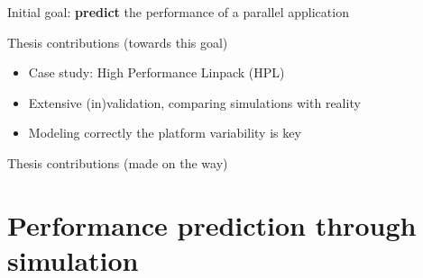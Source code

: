 \documentclass[10pt]{beamer}
\begin{document}
\begin{frame}[plain]
    \onslide<+->
    \begin{LARGE}
        Initial goal: \alert{\textbf{predict}} the performance of a parallel application
    \end{LARGE}
    \vfill
    \onslide<+->
    \begin{block}{Thesis contributions (towards this goal)}
        \begin{itemize}
            \item Case study: High Performance Linpack (HPL)
            \item Extensive (in)validation, comparing simulations with reality
            \item Modeling correctly the platform variability is key
        \end{itemize}
    \end{block}
    \onslide<+->
    \begin{block}{Thesis contributions (made on the way)}
    \end{block}
\end{frame}

\section{Performance prediction through simulation}%
\end{document}
